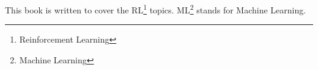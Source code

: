 \documentclass[12pt,a4paper]{article}
\begin{document}
This book is written to cover the RL\footnote{Reinforcement Learning} topics. ML\footnote{Machine Learning} stands for Machine Learning.
\end{document}
